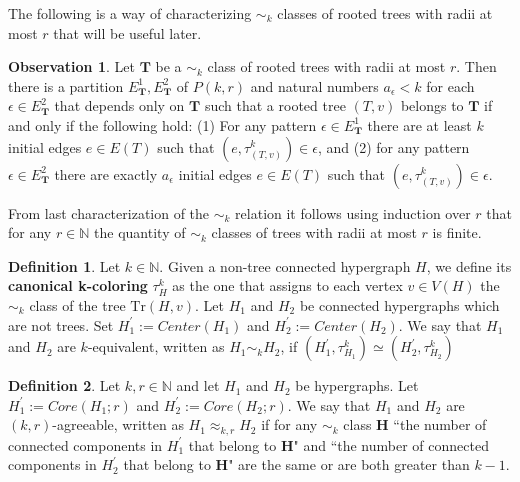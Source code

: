 \documentclass[12pt,notitlepage,a4paper]{article}
\theoremstyle{definition}
\newtheorem{obs}{Observation}[section]
\newtheorem{definition}{Definition}[section]
\newcommand{\N}{\mathbb{N}}
\newcommand{\Tr}{\mathrm{Tr}}
\begin{document}
The following is a way of characterizing $\sim_k$ classes
of rooted trees with radii at most $r$ that will be useful later. 

\begin{obs}\label{obs:equivalenttrees}
	Let $\mathbf{T}$ be a $\sim_k$ class of rooted trees with
	radii at most $r$. Then there is a partition $E^1_\mathbf{T},
	E^2_\mathbf{T}$ of $P(k,r)$ and natural numbers $a_\epsilon<k$
	for each $\epsilon\in E^2_\mathbf{T}$ that depends only on 
	$\mathbf{T}$ such that a rooted tree $(T,v)$ belongs to
	$\mathbf{T}$ if and only if the following hold: (1) For any pattern 
	$\epsilon\in E^1_\mathbf{T}$ there are at least $k$ initial edges $e\in E(T)$ such that
	$(e,\tau^k_{(T,v)})\in \epsilon$, and (2) for any pattern 
	$\epsilon\in E^2_\mathbf{T}$ there are exactly
	$a_\epsilon$ initial edges $e\in E(T)$ such that
	$(e,\tau^k_{(T,v)})\in \epsilon$.	
\end{obs}

From last characterization of the $\sim_k$ relation
it follows using induction over $r$ that for any $r\in \N$ the quantity
of $\sim_k$ classes of trees with radii at most $r$ is finite. \par



\begin{definition} \label{def:sim_general}
	Let $k\in \N$. 
	Given a non-tree connected hypergraph  $H$, we define
	its \textbf{canonical k-coloring} $\tau^k_{H}$
	as the one that assigns to each vertex $v\in V(H)$ the $\sim_k$ 
	class of the tree
	$\Tr(H,v)$.
	Let $H_1$ and $H_2$ be connected hypergraphs which are not trees.
	Set $H^\prime_1:= Center(H_1)$ and $H^\prime_2:= Center(H_2)$.
	We say that $H_1$ and $H_2$ are $k$-equivalent,
	written as $H_1\sim_k H_2$, if
	$( H^\prime_1,\tau^k_{H_1}) \simeq 
	(H^\prime_2,\tau^k_{H_2})$
\end{definition}

\begin{definition} \label{def:agreeability}
	Let $k,r\in\N$ and let $H_1$ and $H_2$ be hypergraphs.
	Let $H^\prime_1:=Core(H_1;r)$ and $H^\prime_2:=Core(H_2;r)$. 
	We say that $H_1$ and $H_2$ are $(k,r)$-agreeable, written
	as $H_1\approx_{k,r} H_2$ if for any $\sim_k$ class $\mathbf{H}$ 
	``the number of connected
	components in $H^\prime_1$ that belong to $\mathbf{H}$" and
	``the number of connected components in $H^\prime_2$ that belong to 
	$\mathbf{H}$" are the same or are both greater than $k-1$.\par
	
\end{definition}
\end{document}
